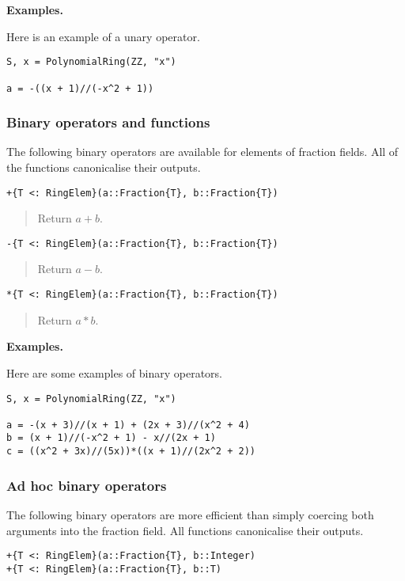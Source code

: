 \documentclass[a4paper,10pt]{article}
\newcommand{\desc}[1]{\vspace{-3mm}\begin{quote}#1\end{quote}}
\begin{document}
\textbf{Examples.}

Here is an example of a unary operator.

\begin{lstlisting}
S, x = PolynomialRing(ZZ, "x")

a = -((x + 1)//(-x^2 + 1))
\end{lstlisting}

\subsubsection{Binary operators and functions}

The following binary operators are available for elements of fraction fields.
All of the functions canonicalise their outputs.

\begin{lstlisting}
+{T <: RingElem}(a::Fraction{T}, b::Fraction{T})
\end{lstlisting}

\desc{Return $a + b$.}

\begin{lstlisting}
-{T <: RingElem}(a::Fraction{T}, b::Fraction{T})
\end{lstlisting}

\desc{Return $a - b$.}

\begin{lstlisting}
*{T <: RingElem}(a::Fraction{T}, b::Fraction{T})
\end{lstlisting}

\desc{Return $a*b$.}

\textbf{Examples.}

Here are some examples of binary operators.

\begin{lstlisting}
S, x = PolynomialRing(ZZ, "x")

a = -(x + 3)//(x + 1) + (2x + 3)//(x^2 + 4)
b = (x + 1)//(-x^2 + 1) - x//(2x + 1)
c = ((x^2 + 3x)//(5x))*((x + 1)//(2x^2 + 2))
\end{lstlisting}

\subsubsection{Ad hoc binary operators}

The following binary operators are more efficient than simply coercing both
arguments into the fraction field. All functions canonicalise their outputs.

\begin{lstlisting}
+{T <: RingElem}(a::Fraction{T}, b::Integer)
+{T <: RingElem}(a::Fraction{T}, b::T)
\end{lstlisting}
\end{document}
